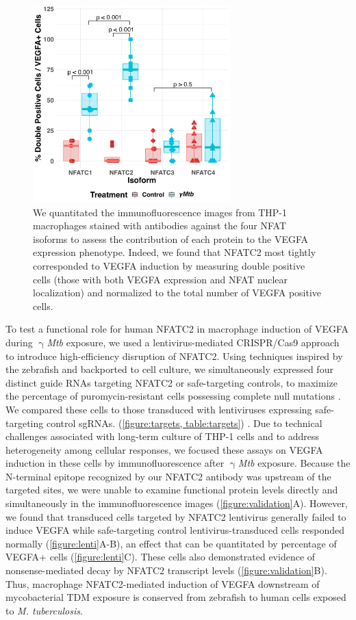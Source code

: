 \begin{figure}
\centering
\includegraphics[height=3in]{images/NFAT_isoforms_110222.png}
\caption{We quantitated the immunofluorescence images from THP-1 macrophages stained with antibodies against the four NFAT isoforms to assess the contribution of each protein to the VEGFA expression phenotype. Indeed, we found that NFATC2 most tightly corresponded to VEGFA induction by measuring double positive cells (those with both VEGFA expression and NFAT nuclear localization) and normalized to the total number of VEGFA positive cells.}
\label{figure:isoformsquant}
\end{figure}

To test a functional role for human NFATC2 in macrophage induction of VEGFA during $\upgamma$\textit{Mtb} exposure, we used a lentivirus-mediated CRISPR/Cas9 approach to introduce high-efficiency disruption of NFATC2. Using techniques inspired by the zebrafish and backported to cell culture, we simultaneously expressed four distinct guide RNAs targeting NFATC2 or safe-targeting controls, to maximize the percentage of puromycin-resistant cells possessing complete null mutations \citep{Wu2018}. We compared these cells to those transduced with lentiviruses expressing safe-targeting control sgRNAs. (\autoref{figure:targets, table:targets}) \citep{Kabadi2014, Sanjana2014, Morgens2017, Kitamura2021}. Due to technical challenges associated with long-term culture of THP-1 cells and to address heterogeneity among cellular responses, we focused these assays on VEGFA induction in these cells by immunofluorescence after $\upgamma$\textit{Mtb} exposure. Because the N-terminal epitope recognized by our NFATC2 antibody was upstream of the targeted sites, we were unable to examine functional protein levels directly and simultaneously in the immunofluorescence images (\autoref{figure:validation}A). However, we found that transduced cells targeted by NFATC2 lentivirus generally failed to induce VEGFA while safe-targeting control lentivirus-transduced cells responded normally (\autoref{figure:lenti}A-B), an effect that can be quantitated by percentage of VEGFA+ cells (\autoref{figure:lenti}C). These cells also demonstrated evidence of nonsense-mediated decay by NFATC2 transcript levels (\autoref{figure:validation}B). Thus, macrophage NFATC2-mediated induction of VEGFA downstream of mycobacterial TDM exposure is conserved from zebrafish to human cells exposed to \textit{M. tuberculosis}.

